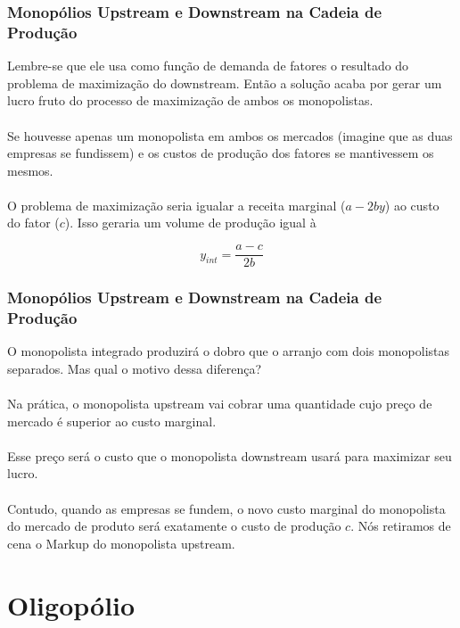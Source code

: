\documentclass{beamer}[10]
\begin{document}
\begin{frame}
	\frametitle{Monopólios Upstream e Downstream na Cadeia de Produção}

	Lembre-se que ele usa como função de demanda de fatores o resultado do problema de maximização do downstream. Então a solução acaba por gerar um lucro fruto do processo de maximização de ambos os monopolistas.
	\\~\\
	Se houvesse apenas um monopolista em ambos os mercados (imagine que as duas empresas se fundissem) e os custos de produção dos fatores se mantivessem os mesmos.
	\\~\\
	O problema de maximização seria igualar a receita marginal ($a - 2by$) ao custo do fator ($c$). Isso geraria um volume de produção igual à

	$$ y_{int} = \frac{a - c}{2b}$$

\end{frame}

\begin{frame}
	\frametitle{Monopólios Upstream e Downstream na Cadeia de Produção}

	O monopolista integrado produzirá o dobro que o arranjo com dois monopolistas separados. Mas qual o motivo dessa diferença?
	\\~\\
	Na prática, o monopolista upstream vai cobrar uma quantidade cujo preço de mercado é superior ao custo marginal. 
	\\~\\
	Esse preço será o custo que o monopolista downstream usará para maximizar seu lucro. 
	\\~\\
	Contudo, quando as empresas se fundem, o novo custo marginal do monopolista do mercado de produto será exatamente o custo de produção $c$. Nós retiramos de cena o Markup do monopolista upstream.

\end{frame}

\section{Oligopólio}
\end{document}
